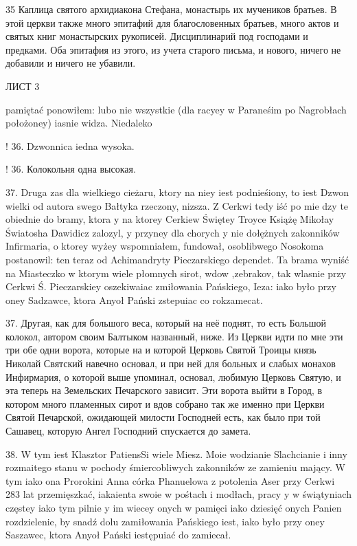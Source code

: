35 Каплица святого архидиакона Стефана, монастырь их мучеников братьев. В этой церкви также много эпитафий для благословенных братьев, много актов и святых книг монастырских рукописей. Дисциплинарий под господами и предками. Оба эпитафия из этого, из учета старого письма, и нового, ничего не добавили и ничего не убавили.


ЛИСТ 3

pamiętać ponowiłem: lubo nie wszystkie (dla racyey w Paraneśim po Nagrobłach położoney) iasnie widza. Niedaleko


! 36. Dzwonnica iedna wysoka.

! 36. Колокольня одна высокая.

37. Druga zas dla wielkiego cieżaru, ktory na niey iest podnieśiony, to iest Dzwon wielki od autora swego Bałtyka rzeczony, nizsza. Z Cerkwi tedy iść po mie dzy te obiednie do bramy, ktora y na ktorey Cerkiew Świętey Troyce Książę Mikołay Światosha Dawidicz zalozyl, y przyney dla chorych y nie dołężnych zakonników Infirmaria, o ktorey wyżey wspomniałem, fundował, osoblibwego Nosokoma postanowil: ten teraz od Achimandryty Pieczarskiego dependet.
Ta brama wyniść na Miasteczko w ktorym wiele płomnych sirot, wdow ,zebrakov, tak wlasnie przy Cerkwi Ś. Pieczarskiey oszekiwaiac zmiłowania Pańskiego, Ieza: iako było przy oney Sadzawce, ktora Anyoł Pański zstepuiac co rokzamecat.

37. Другая, как для большого веса, который на неё поднят, то есть Большой колокол, автором своим Балтыком названный, ниже. Из Церкви идти по мне эти три обе одни ворота, которые на и которой Церковь Святой Троицы князь Николай Святский навечно основал, и при ней для больных и слабых монахов Инфирмария, о которой выше упоминал, основал, любимую Церковь Святую, и эта теперь на Земельских Печарского зависит. Эти ворота выйти в Город, в котором много пламенных сирот и вдов собрано так же именно при Церкви Святой Печарской, ожидающей милости Господней есть, как было при той Сашавец, которую Ангел Господний спускается до замета.


38. W tym iest Klasztor PatiensSi wiele Miesz. Moie wodzianie Slachcianie i inny rozmaitego stanu w pochody śmiercobliwych zakonników ze zamieniu mający. W tym iako ona Prorokini Anna córka Phanuelowa z potolenia Aser przy Cerkwi 283 lat przemięszkać, iakaienta swoie w pośtach i modłach, pracy y w świątyniach częstey iako tym pilnie y im wiecey onych w pamięci iako dziesięć onych Panien rozdzielenie, by snadź dolu zamiłowania Pańskiego iest, iako było przy oney Saszawec, ktora Anyoł Pański iestępuiać do zamiecał.

